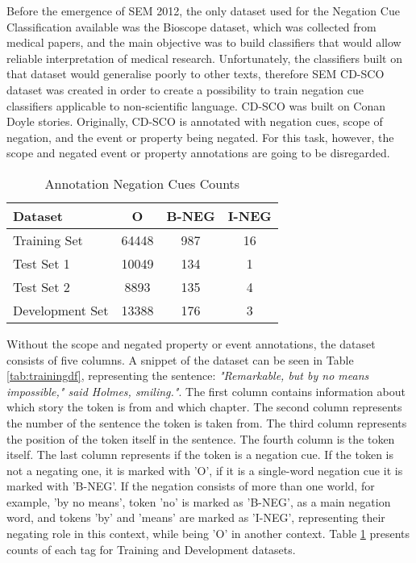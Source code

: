  
Before the emergence of SEM 2012, the only dataset used for the Negation Cue Classification available was the Bioscope dataset, which was collected from medical papers, and the main objective was to build classifiers that would allow reliable interpretation of medical research. Unfortunately, the classifiers built on that dataset would generalise poorly to other texts, therefore SEM CD-SCO dataset was created in order to create a possibility to train negation cue classifiers applicable to non-scientific language. CD-SCO was built on Conan Doyle stories. Originally, CD-SCO is annotated with negation cues, scope of negation, and the event or property being negated. For this task, however, the scope and negated event or property annotations are going to be disregarded.


\begin{table}[!h]
\centering
\caption{\label{tab:tags} Annotation Negation Cues Counts}
\begin{tabular}{lccc}
\hline
\multicolumn{1}{l}{\textbf{Dataset}} & \multicolumn{1}{c}{\textbf{O}} & \multicolumn{1}{c}{\textbf{B-NEG}} & \multicolumn{1}{c}{\textbf{I-NEG}}                                                                                            \\ 
\hline
Training Set & 64448 & 987 & 16\\
Test Set 1 & 10049 & 134 & 1\\
Test Set 2 & 8893 & 135 & 4\\
Development Set & 13388 & 176 & 3 \\
\hline
\end{tabular}
\end{table}



Without the scope and negated property or event annotations, the dataset consists of five columns. A snippet of the dataset can be seen in Table \ref{tab:trainingdf}, representing the sentence: \textit{"Remarkable, but by no means impossible," said Holmes, smiling."}. The first column contains information about which story the token is from and which chapter. The second column represents the number of the sentence the token is taken from. The third column represents the position of the token itself in the sentence. The fourth column is the token itself. The last column represents if the token is a negation cue. If the token is not a negating one, it is marked with 'O', if it is a single-word negation cue it is marked with 'B-NEG'. If the negation consists of more than one world, for example, 'by no means', token 'no' is marked as 'B-NEG', as a main negation word, and tokens 'by' and 'means' are marked as 'I-NEG', representing their negating role in this context, while being 'O' in another context. Table \ref{tab:tags}  presents counts of each tag for Training and Development datasets.




